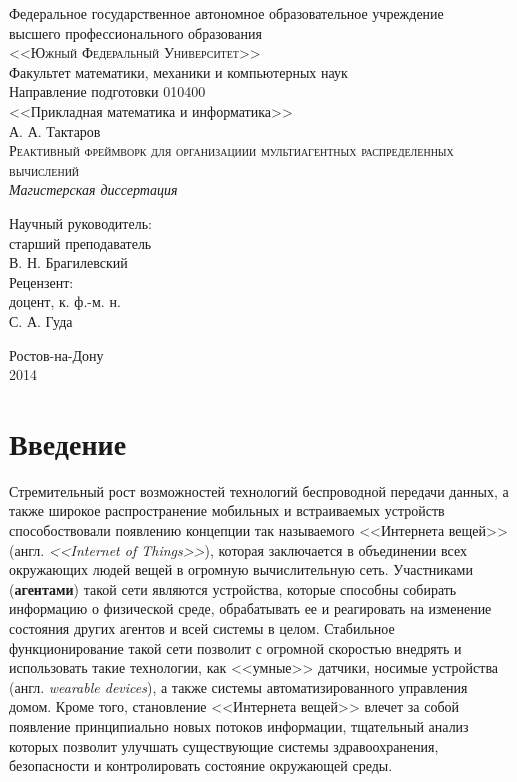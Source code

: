 \documentclass[a4paper,14pt,href]{article}
\begin{document}
\thispagestyle{empty}
\begin{center}
Федеральное государственное автономное образовательное учреждение \\
высшего профессионального образования \\
\textsc{<<Южный Федеральный Университет>>}\\[1.0cm]

Факультет математики, механики и компьютерных наук\\[1.0cm]

Направление подготовки 010400 \\
<<Прикладная математика и информатика>>\\[3cm]

А. А. Тактаров \\[1.0cm]
\textsc{Реактивный фреймворк для организациии мультиагентных распределенных вычислений}\\[1.0cm]

\textit{Магистерская диссертация}\\[2.0cm]

\begin{flushright}
    Научный руководитель: \\
    старший преподаватель \\
    В. Н. Брагилевский \\[1.0cm]

    Рецензент: \\
    доцент, к. ф.-м. н.\\
    С. А. Гуда
\end{flushright}

\vfill

  Ростов-на-Дону\\
  2014
\end{center}

\newpage
\tableofcontents

\newpage
\section*{Введение}

Стремительный рост возможностей технологий беспроводной передачи данных, а также широкое распространение мобильных и
встраиваемых устройств способоствовали появлению концепции так называемого <<Интернета вещей>>
(англ. \textit{<<Internet of Things>>})\cite{IoTWired}, которая заключается в объединении всех окружающих людей вещей в
огромную вычислительную сеть. Участниками (\textbf{агентами}) такой сети являются устройства, которые способны собирать
информацию о физической среде, обрабатывать ее и реагировать на изменение состояния других агентов и всей системы в целом.
Стабильное функционирование такой сети позволит с огромной скоростью внедрять и использовать такие технологии, как
<<умные>> датчики\cite{NestThermostat}, носимые устройства (англ. \textit{wearable devices}), а также системы
автоматизированного управления домом. Кроме того, становление <<Интернета вещей>> влечет за собой появление
принципиально новых потоков информации, тщательный анализ которых позволит улучшать существующие системы
здравоохранения, безопасности и контролировать состояние окружающей среды.
\end{document}
